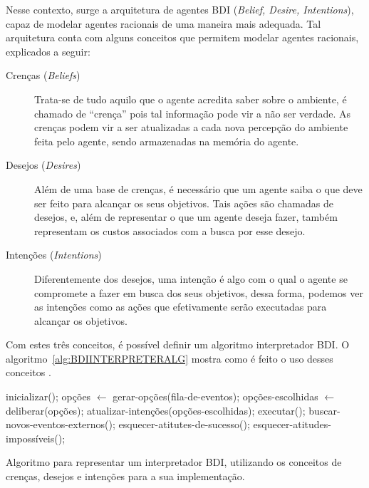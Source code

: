 Nesse contexto, surge a arquitetura de agentes BDI (\textit{Belief, Desire,
Intentions}), capaz de modelar agentes racionais de uma maneira mais adequada.
Tal arquitetura conta com alguns conceitos que permitem modelar agentes
racionais, explicados a seguir:

\begin{description}
    \item [Crenças (\textit{Beliefs})]
        Trata-se de tudo aquilo que o agente acredita saber sobre o ambiente,
        é chamado de ``crença'' pois tal informação pode vir a não ser verdade.
        As crenças podem vir a ser atualizadas a cada nova percepção do ambiente
        feita pelo agente, sendo armazenadas na memória do agente.
    \item [Desejos (\textit{Desires})]
        Além de uma base de crenças, é necessário que um agente saiba o que deve
        ser feito para alcançar os seus objetivos. Tais ações são chamadas de
        desejos, e, além de representar o que um agente deseja fazer, também
        representam os custos associados com a busca por esse desejo.
    \item [Intenções (\textit{Intentions})]
        Diferentemente dos desejos, uma intenção é algo com o qual o agente se
        compromete a fazer em busca dos seus objetivos, dessa forma, podemos ver
        as intenções como as ações que efetivamente serão executadas para
        alcançar os objetivos.
\end{description}

Com estes três conceitos, é possível definir um algoritmo interpretador
BDI. O algoritmo~\ref{alg:BDIINTERPRETERALG} mostra como é feito o uso desses
conceitos \cite{BDIFROMTHEORYTOPRACTICE}.

\begin{algorithm}[htb]
\begin{center}
    \begin{algorithmic}[1]
        \STATE inicializar();
        \STATE
            \STATE opções $\gets$ gerar-opções(fila-de-eventos);
            \STATE opções-escolhidas $\gets$ deliberar(opções);
            \STATE atualizar-intenções(opções-escolhidas);
            \STATE executar();
            \STATE buscar-novos-eventos-externos();
            \STATE esquecer-atitutes-de-sucesso();
            \STATE esquecer-atitudes-impossíveis();
        \ENDWHILE
    \end{algorithmic}
\end{center}
\caption[Algoritmo para representar um interpretador BDI.]
    {\label{alg:BDIINTERPRETERALG}
        Algoritmo para representar um interpretador BDI, utilizando os conceitos
        de crenças, desejos e intenções para a sua implementação.}
\end{algorithm}

